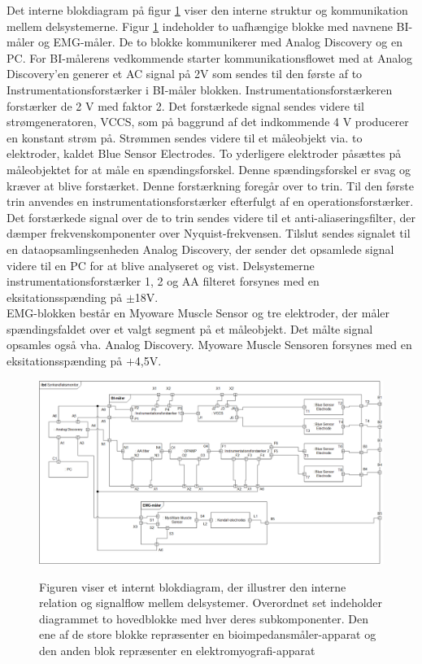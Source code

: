Det interne blokdiagram på figur \ref{ibdfigur} viser den interne struktur og kommunikation mellem delsystemerne. Figur \ref{ibdfigur} indeholder to uafhængige blokke med navnene BI-måler og EMG-måler. De to blokke kommunikerer med Analog Discovery og en PC. For BI-målerens vedkommende starter kommunikationsflowet med at Analog Discovery'en generer et AC signal på 2V som sendes til den første af to Instrumentationsforstærker i BI-måler blokken. Instrumentationsforstærkeren forstærker de 2 V med faktor 2. Det forstærkede signal sendes videre til strømgeneratoren, VCCS, som på baggrund af det indkommende 4 V producerer en konstant strøm på. Strømmen sendes videre til et måleobjekt via. to elektroder, kaldet Blue Sensor Electrodes.  To yderligere elektroder påsættes på måleobjektet for at måle en spændingsforskel. Denne spændingsforskel er svag og kræver at blive forstærket. Denne forstærkning foregår over to trin. Til den første trin anvendes en instrumentationsforstærker efterfulgt af en operationsforstærker. Det forstærkede signal over de to trin sendes videre til et anti-aliaseringsfilter, der dæmper frekvenskomponenter over Nyquist-frekvensen. Tilslut sendes signalet til en dataopsamlingsenheden Analog Discovery, der sender det opsamlede signal videre til en PC for at blive analyseret og vist. Delsystemerne instrumentationsforstærker 1, 2 og AA filteret forsynes med en eksitationsspænding på $ \pm  $18V. \\

EMG-blokken består en Myoware Muscle Sensor og tre elektroder, der måler spændingsfaldet over et valgt segment på et måleobjekt. Det målte signal opsamles også vha. Analog Discovery. Myoware Muscle Sensoren forsynes med en eksitationsspænding på $+$4,5V.  

\begin{figure}[H]
\centering
{\includegraphics[width=\linewidth]
{Figure/IBD}}
\caption{Figuren viser et internt blokdiagram, der illustrer den interne relation og signalflow mellem delsystemer. Overordnet set indeholder diagrammet to hovedblokke med hver deres subkomponenter. Den ene af de store blokke repræsenter en bioimpedansmåler-apparat og den anden blok repræsenter en elektromyografi-apparat }
\label{ibdfigur}
\end{figure}

